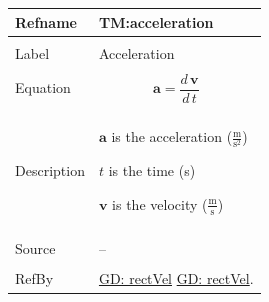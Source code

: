 \documentclass[12pt]{article}
\begin{document}
\noindent \begin{minipage}{\textwidth}
\begin{tabular}{p{} p{}}
\toprule \textbf{Refname} & \textbf{TM:acceleration}
\label{TM:acceleration}
\\ \midrule \\
Label & Acceleration
\\ \midrule \\
Equation & \begin{displaymath}
           \mathbf{a}=\frac{d\,\mathbf{v}}{d\,t}
           \end{displaymath}
\\ \midrule \\
Description & \begin{symbDescription}
              \item{$\mathbf{a}$ is the acceleration ($\frac{\text{m}}{\text{s}^{2}}$)}
              \item{$t$ is the time (s)}
              \item{$\mathbf{v}$ is the velocity ($\frac{\text{m}}{\text{s}}$)}
              \end{symbDescription}
\\ \midrule \\
Source & --
\\ \midrule \\
RefBy & \hyperref[GD:rectVel]{GD: rectVel} \hyperref[GD:rectVel]{GD: rectVel}.
\\ \bottomrule \end{tabular}
\end{minipage}
\par~
\end{document}

